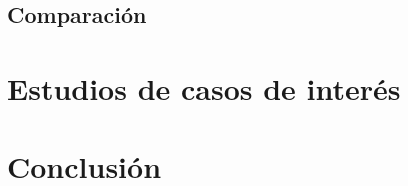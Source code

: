 \documentclass[12pt,a4paper,]{book}
\def\ifdoblecara{} %
\def\ifprincipal{} %
\numberwithin{dummy}{section}
\theoremstyle{ocrenumbox}
\theoremstyle{blacknumex}
\theoremstyle{blacknumbox}
\theoremstyle{ocrenum}
\theoremstyle{ocrenum}
\begin{document}
\hypertarget{comparaciuxf3n}{%
\section{Comparación}\label{comparaciuxf3n}}

\FloatBarrier

\ifdefined\ifprincipal
\else
\setlength{\parindent}{1em}
\pagestyle{fancy}
\setcounter{tocdepth}{4}
\tableofcontents

\fi

\ifdefined\ifdoblecara
\fancyhead{}{}
\fancyhead[LE,RO]{\scriptsize\rightmark}
\fancyfoot[LO,RE]{\scriptsize\slshape \leftmark}
\fancyfoot[C]{}
\fancyfoot[LE,RO]{\footnotesize\thepage}
\else
\fancyhead{}{}
\fancyhead[RO]{\scriptsize\rightmark}
\fancyfoot[LO]{\scriptsize\slshape \leftmark}
\fancyfoot[C]{}
\fancyfoot[RO]{\footnotesize\thepage}
\fi

\renewcommand{\headrulewidth}{0.4pt}
\renewcommand{\footrulewidth}{0.4pt}

\hypertarget{estudios-de-casos-de-interuxe9s}{%
\chapter{Estudios de casos de
interés}\label{estudios-de-casos-de-interuxe9s}}

\FloatBarrier

\ifdefined\ifprincipal
\else
\setlength{\parindent}{1em}
\pagestyle{fancy}
\setcounter{tocdepth}{4}
\tableofcontents

\fi

\ifdefined\ifdoblecara
\fancyhead{}{}
\fancyhead[LE,RO]{\scriptsize\rightmark}
\fancyfoot[LO,RE]{\scriptsize\slshape \leftmark}
\fancyfoot[C]{}
\fancyfoot[LE,RO]{\footnotesize\thepage}
\else
\fancyhead{}{}
\fancyhead[RO]{\scriptsize\rightmark}
\fancyfoot[LO]{\scriptsize\slshape \leftmark}
\fancyfoot[C]{}
\fancyfoot[RO]{\footnotesize\thepage}
\fi

\renewcommand{\headrulewidth}{0.4pt}
\renewcommand{\footrulewidth}{0.4pt}

\hypertarget{conclusiuxf3n}{%
\chapter{Conclusión}\label{conclusiuxf3n}}

\FloatBarrier
\appendix

\ifdefined\ifprincipal
\else
\setlength{\parindent}{1em}
\pagestyle{fancy}
\setcounter{tocdepth}{4}
\tableofcontents
\end{document}
